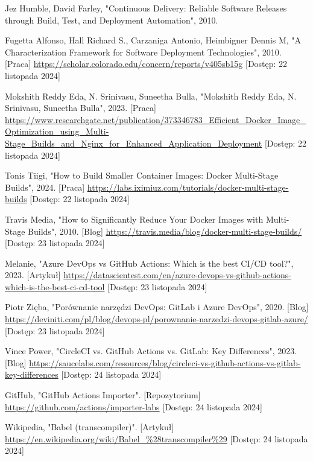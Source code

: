 \documentclass{article}
\begin{document}
\begin{thebibliography}{9}
Jez Humble, David Farley, "Continuous Delivery: Reliable Software Releases through Build, Test, and Deployment Automation", 2010.

Fugetta Alfonso, Hall Richard S., Carzaniga Antonio, Heimbigner Dennis M, "A Characterization Framework for Software Deployment Technologies", 2010. [Praca] \url{https://scholar.colorado.edu/concern/reports/v405sb15g} [Dostęp: 22 listopada 2024]

Mokshith Reddy Eda, N. Srinivasu, Suneetha Bulla, "Mokshith Reddy Eda, N. Srinivasu, Suneetha Bulla", 2023. [Praca] \url{https://www.researchgate.net/publication/373346783_Efficient_Docker_Image_Optimization_using_Multi-Stage_Builds_and_Nginx_for_Enhanced_Application_Deployment} [Dostęp: 22 listopada 2024]

Tonis Tiigi, "How to Build Smaller Container Images: Docker Multi-Stage Builds", 2024. [Praca] \url{https://labs.iximiuz.com/tutorials/docker-multi-stage-builds} [Dostęp: 22 listopada 2024]

Travis Media, "How to Significantly Reduce Your Docker Images with Multi-Stage Builds", 2010. [Blog] \url{https://travis.media/blog/docker-multi-stage-builds/} [Dostęp: 23 listopada 2024]

Melanie, "Azure DevOps vs GitHub Actions: Which is the best CI/CD tool?", 2023. [Artykuł] \url{https://datascientest.com/en/azure-devops-vs-github-actions-which-is-the-best-ci-cd-tool} [Dostęp: 23 listopada 2024]

Piotr Zięba, "Porównanie narzędzi DevOps: GitLab i Azure DevOps", 2020. [Blog] \url{https://deviniti.com/pl/blog/devops-pl/porownanie-narzedzi-devops-gitlab-azure/} [Dostęp: 23 listopada 2024]

Vince Power, "CircleCI vs. GitHub Actions vs. GitLab: Key Differences", 2023. [Blog] \url{https://saucelabs.com/resources/blog/circleci-vs-github-actions-vs-gitlab-key-differences} [Dostęp: 24 listopada 2024]

GitHub, "GitHub Actions Importer". [Repozytorium] \url{https://github.com/actions/importer-labs} [Dostęp: 24 listopada 2024]

Wikipedia, "Babel (transcompiler)". [Artykuł] \url{https://en.wikipedia.org/wiki/Babel_%28transcompiler%29} [Dostęp: 24 listopada 2024]


\end{thebibliography}
\end{document}
